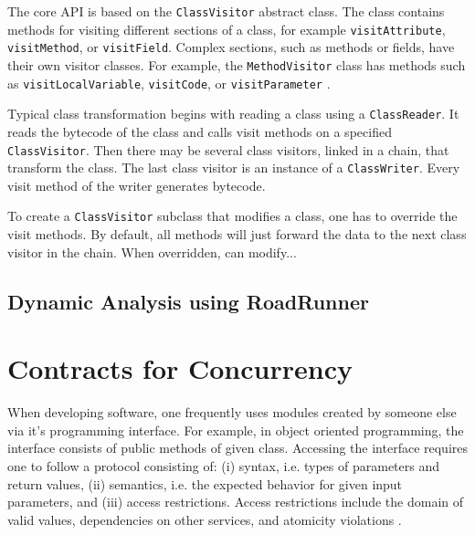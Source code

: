 The core API is based on the \texttt{ClassVisitor} abstract class. The class
contains methods for visiting different sections of a class, for example
\texttt{visitAttribute}, \texttt{visitMethod}, or \texttt{visitField}. Complex
sections, such as methods or fields, have their own visitor classes. For
example, the \texttt{MethodVisitor} class has methods such as
\texttt{visitLocalVariable}, \texttt{visitCode}, or \texttt{visitParameter}
\cite{asmguide}.

Typical class transformation begins with reading a class using a
\texttt{ClassReader}. It reads the bytecode of the class and calls visit methods
on a specified \texttt{ClassVisitor}. Then there may be several class visitors,
linked in a chain, that transform the class. The last class visitor is an
instance of a \texttt{ClassWriter}. Every visit method of the writer generates
bytecode.

To create a \texttt{ClassVisitor} subclass that modifies a class, one has to
override the visit methods. By default, all methods will just forward the data
to the next class visitor in the chain. When overridden, can modify... \todo{}


\section{Dynamic Analysis using RoadRunner}

\cite{RoadRunner}




\chapter{Contracts for Concurrency}


When developing software, one frequently uses modules created by someone else
via it's programming interface. For example, in object oriented programming, the
interface consists of public methods of given class. Accessing the interface
requires one to follow a protocol consisting of: (i) syntax, i.e. types of
parameters and return values, (ii) semantics, i.e. the expected behavior for
given input parameters, and (iii) access restrictions. Access restrictions
include the domain of valid values, dependencies on other services, and
atomicity violations \cite{FITPUB11510}.

